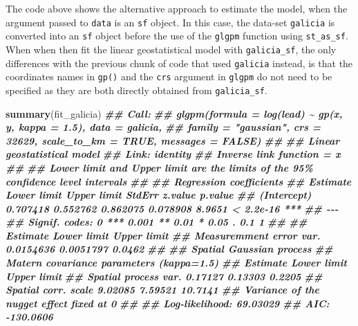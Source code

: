 \documentclass[
  letterpaper,
]{krantz}
\newenvironment{Shaded}{\begin{snugshade}}{\end{snugshade}}
\newcommand{\DocumentationTok}[1]{\textcolor[rgb]{0.56,0.35,0.01}{\textbf{\textit{#1}}}}
\newcommand{\FunctionTok}[1]{\textcolor[rgb]{0.13,0.29,0.53}{\textbf{#1}}}
\newcommand{\NormalTok}[1]{#1}
\begin{document}
The code above shows the alternative approach to estimate the model,
when the argument passed to \texttt{data} is an \texttt{sf} object. In
this case, the data-set \texttt{galicia} is converted into an
\texttt{sf} object before the use of the \texttt{glgpm} function using
\texttt{st\_as\_sf}. When when then fit the linear geostatistical model
with \texttt{galicia\_sf}, the only differences with the previous chunk
of code that used \texttt{galicia} instead, is that the coordinates
names in \texttt{gp()} and the \texttt{crs} argument in \texttt{glgpm}
do not need to be specified as they are both directly obtained from
\texttt{galicia\_sf}.

\begin{Shaded}
\begin{Highlighting}[]
\FunctionTok{summary}\NormalTok{(fit\_galicia)}
\DocumentationTok{\#\# Call:}
\DocumentationTok{\#\# glgpm(formula = log(lead) \textasciitilde{} gp(x, y, kappa = 1.5), data = galicia, }
\DocumentationTok{\#\#     family = "gaussian", crs = 32629, scale\_to\_km = TRUE, messages = FALSE)}
\DocumentationTok{\#\# }
\DocumentationTok{\#\# Linear geostatistical model}
\DocumentationTok{\#\# Link: identity }
\DocumentationTok{\#\# Inverse link function = x }
\DocumentationTok{\#\#  }
\DocumentationTok{\#\# \textquotesingle{}Lower limit\textquotesingle{} and \textquotesingle{}Upper limit\textquotesingle{} are the limits of the 95\% confidence level intervals}
\DocumentationTok{\#\# }
\DocumentationTok{\#\# Regression coefficients}
\DocumentationTok{\#\#             Estimate Lower limit Upper limit   StdErr z.value   p.value    }
\DocumentationTok{\#\# (Intercept) 0.707418    0.552762    0.862075 0.078908  8.9651 \textless{} 2.2e{-}16 ***}
\DocumentationTok{\#\# {-}{-}{-}}
\DocumentationTok{\#\# Signif. codes:  0 \textquotesingle{}***\textquotesingle{} 0.001 \textquotesingle{}**\textquotesingle{} 0.01 \textquotesingle{}*\textquotesingle{} 0.05 \textquotesingle{}.\textquotesingle{} 0.1 \textquotesingle{} \textquotesingle{} 1}
\DocumentationTok{\#\# }
\DocumentationTok{\#\#                          Estimate Lower limit Upper limit}
\DocumentationTok{\#\# Measuremment error var. 0.0154636   0.0051797      0.0462}
\DocumentationTok{\#\# }
\DocumentationTok{\#\# Spatial Gaussian process}
\DocumentationTok{\#\# Matern covariance parameters (kappa=1.5)}
\DocumentationTok{\#\#                      Estimate Lower limit Upper limit}
\DocumentationTok{\#\# Spatial process var.  0.17127     0.13303      0.2205}
\DocumentationTok{\#\# Spatial corr. scale   9.02085     7.59521     10.7141}
\DocumentationTok{\#\# Variance of the nugget effect fixed at 0}
\DocumentationTok{\#\# }
\DocumentationTok{\#\# Log{-}likelihood: 69.03029}
\DocumentationTok{\#\# AIC: {-}130.0606}
\end{Highlighting}
\end{Shaded}
\end{document}
